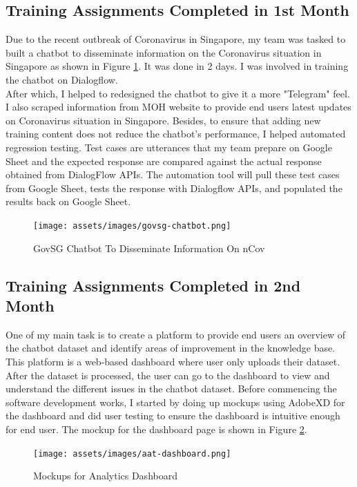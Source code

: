 \subsection{Training Assignments Completed in 1st Month}
Due to the recent outbreak of Coronavirus in Singapore, my team was tasked to built a chatbot to disseminate information on the Coronavirus situation in Singapore as shown in Figure \ref{fig:govsg-chatbot}. It was done in 2 days. I was involved in training the chatbot on Dialogflow.\\
\noindent
After which, I helped to redesigned the chatbot to give it a more "Telegram" feel. I also scraped information from MOH website to provide end users latest updates on Coronavirus situation in Singapore. Besides, to ensure that adding new training content does not reduce the chatbot's performance, I helped automated regression testing. Test cases are utterances that my team prepare on Google Sheet and the expected response are compared against the actual response obtained from DialogFlow APIs. The automation tool will pull these test cases from Google Sheet, tests the response with Dialogflow APIs, and populated the results back on Google Sheet.
\begin{figure}[h!]
	\begin{center}
		\texttt{[image: assets/images/govsg-chatbot.png]}
		\caption{GovSG Chatbot To Disseminate Information On nCov}
		\label{fig:govsg-chatbot}
	\end{center}
\end{figure}

\subsection{Training Assignments Completed in 2nd Month}
\noindent
One of my main task is to create a platform to provide end users an overview of the chatbot dataset and identify areas of improvement in the knowledge base. This platform is a web-based dashboard where user only uploads their dataset. After the dataset is processed, the user can go to the dashboard to view and understand the different issues in the chatbot dataset. Before commencing the software development works, I started by doing up mockups using AdobeXD for the dashboard and did user testing to ensure the dashboard is intuitive enough for end user. The mockup for the dashboard page is shown in Figure \ref{fig:aat-dashboard}.

\begin{figure}[h!]
	\begin{center}
		\texttt{[image: assets/images/aat-dashboard.png]}
		\caption{Mockups for Analytics Dashboard}
		\label{fig:aat-dashboard}
	\end{center}
\end{figure}

